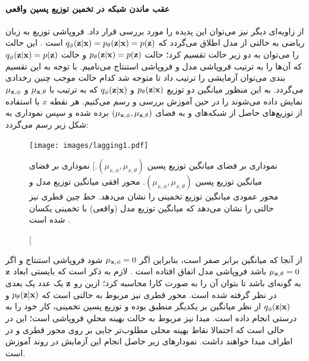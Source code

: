 \paragraph*{عقب ماندن شبکه
	\encoder{}
	در تخمین توزیع پسین واقعی}
از زاویه‌ای دیگر نیز می‌توان این پدیده را مورد بررسی قرار داد. فروپاشی توزیع \posterior{} به زبان ریاضی به حالتی از مدل اطلاق می‌گردد که
$q_\phi({\bf z}|{\bf x}) = p_\theta ({\bf z}|{\bf x}) = p({\bf z})$
است \cite{vae_lagging}. این حالت را می‌توان به دو زیر حالت تقسیم کرد؛ حالت $p_\theta({\bf z}|{\bf x}) = p({\bf z})$ و حالت $q_\phi({\bf z}|{\bf x}) = p({\bf z})$ که آن‌ها را به ترتیب فروپاشی مدل و فروپاشی استنتاج می‌نامیم. با توجه به این تقسیم بندی می‌توان آزمایشی را ترتیب داد تا متوجه شد کدام حالت موجب چنین رخدادی می‌گردد. به این منظور میانگین دو توزیع $p_\theta({\bf z}|{\bf x})$ و $q_\phi({\bf z}|{\bf x})$ که به ترتیب با $\mu_{{\bf x},\theta}$ و $\mu_{{\bf x},\phi}$ نمایش داده می‌شوند را در حین آموزش بررسی و رسم می‌کنیم. هر نقطه $x$ با استفاده از توزیع‌های حاصل از شبکه‌های \encoder{} و \decoder{} به فضای
$(\mu_{{\bf x},\phi}, \mu_{{\bf x},\theta})$
برده شده و سپس نموداری به شکل زیر رسم می‌گردد:
\begin{figure}[H]
	\centering
	\texttt{[image: images/lagging1.pdf]}
	\caption
    [نموداری بر فضای میانگین توزیع پسین $(\mu_{x,\phi}, \mu_{x,\theta})$.]
    {
		نموداری بر فضای میانگین توزیع پسین $(\mu_{x,\phi}, \mu_{x,\theta})$. محور افقی میانگین توزیع \posterior{} مدل و محور عمودی میانگین توزیع \posterior{} تخمینی را نشان می‌دهد. خط چین قطری نیز حالتی را نشان می‌دهد که میانگین توزیع \posterior{} مدل (واقعی) با تخمینی یکسان شده است \cite{infovae}.
	}
\end{figure}

از آنجا که میانگین \priordist{} برابر صفر است، بنابراین اگر $\mu_{{\bf x},\phi} = 0$ شود فروپاشی استنتاج و اگر $\mu_{{\bf x},\theta} = 0$ باشد فروپاشی مدل اتفاق افتاده است \cite{infovae}. لازم به ذکر است که بایستی ابعاد ${\bf z}$ به گونه‌ای باشد تا بتوان آن را به صورت کارا محاسبه کرد؛ ازین رو ${\bf z}$ یک عدد یک بعدی در نظر گرفته شده است. محور قطری نیز مربوط به حالتی است که $p_\theta({\bf z}|{\bf x})$ و $q_\phi({\bf z}|{\bf x})$ از نظر میانگین بر یکدیگر منطبق بوده و توزیع پسین تخمینی، کار خود را به درستی انجام داده است. مبدا نیز مربوط به حالت بهینه محلیِ فروپاشی \posteriordist{} است؛ این در حالی است که احتمالا نقاط بهینه محلی مطلوب‌تر جایی بر روی محور قطری و در اطراف مبدا خواهند داشت.
نمودار‌های زیر حاصل انجام این آزمایش در روند آموزش است.

